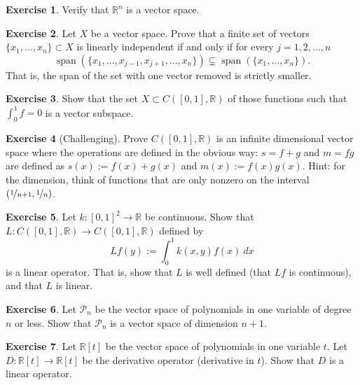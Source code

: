 \documentclass[12pt]{book}
\newcommand{\R}{{\mathbb{R}}}
\newcommand{\sP}{{\mathcal{P}}}
\newcommand{\spn}{\operatorname{span}}
\theoremstyle{plain}
\theoremstyle{remark}
\theoremstyle{definition}
\theoremstyle{exercise}
\newtheorem{exercise}{Exercise}[section]
\theoremstyle{example}
\begin{document}
\begin{exercise}
Verify that $\R^n$ is a vector space.
\end{exercise}

\begin{exercise}
Let $X$ be a vector space.
Prove that a finite set of vectors $\{ x_1,\ldots,x_n \} \subset X$ 
is linearly independent if and only if for every $j=1,2,\ldots,n$
\begin{equation*}
\spn( \{ x_1,\ldots,x_{j-1},x_{j+1},\ldots,x_n \}) \subsetneq
\spn( \{ x_1,\ldots,x_n \}) .
\end{equation*}
That is, the span of the set with one vector removed is strictly smaller.
\end{exercise}

\begin{exercise}
Show that the set $X \subset C([0,1],\R)$ of those functions such 
that $\int_0^1 f = 0$ is a vector subspace.
\end{exercise}

\begin{exercise}[Challenging]
Prove $C([0,1],\R)$ is an infinite dimensional vector space
where the operations are defined in the obvious way:
$s=f+g$ and $m=fg$ are defined as
$s(x) := f(x)+g(x)$ and
$m(x) := f(x)g(x)$.
Hint: for the dimension, think of functions that are only nonzero
on the interval $(\nicefrac{1}{n+1},\nicefrac{1}{n})$.
\end{exercise}

\begin{exercise}
Let $k \colon [0,1]^2 \to \R$ be continuous.  Show that
$L \colon C([0,1],\R) \to C([0,1],\R)$ defined by
\begin{equation*}
Lf(y) := \int_0^1 k(x,y)f(x)~dx
\end{equation*}
is a linear operator.  That is, show that $L$ is well defined (that
$Lf$ is continuous), and that $L$ is linear.
\end{exercise}

\begin{exercise}
Let $\sP_n$ be the vector space of polynomials in one variable of degree $n$
or less.  Show that $\sP_n$ is a vector space of dimension $n+1$.
\end{exercise}

\begin{exercise}
Let $\R[t]$ be the vector space of polynomials in one variable $t$.  Let
$D \colon \R[t] \to \R[t]$ be the derivative operator (derivative in $t$).
Show that $D$ is a linear operator.
\end{exercise}
\end{document}
